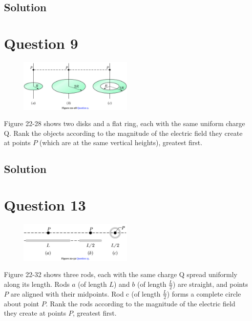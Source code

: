 \documentclass[12pt]{article}
\begin{document}
\subsection*{Solution}


\pagebreak
\section{Question 9}
\begin{figure}
    \vspace{-30pt}
    \includegraphics[width=0.5\textwidth]{picture_3.png} 
\end{figure}
Figure 22-28 shows two disks and a flat ring, each with the same uniform charge Q. Rank the objects according to the magnitude of the electric field they create at points $P$ (which are at the same vertical heights), greatest first.

\subsection*{Solution}


\pagebreak
\section{Question 13}
\begin{figure}
    \vspace{-30pt}
    \includegraphics[width=0.5\textwidth]{picture_4.png} 
\end{figure}
Figure 22-32 shows three rods, each with the same charge Q spread uniformly along its length. Rods $a$ (of length $L$) and $b$ (of length $\frac{L}{2}$) are straight, and points $P$ are aligned with their midpoints. Rod c (of length $\frac{L}{2}$) forms a complete circle about point $P$. Rank the rods according to the magnitude of the electric field they create at points $P$, greatest first.
\end{document}
